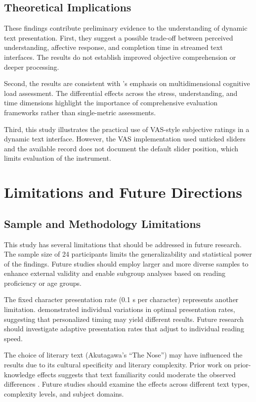 \documentclass[authoryear]{elsarticle}
\begin{document}
\subsection{Theoretical Implications}
These findings contribute preliminary evidence to the understanding of dynamic text presentation. First, they suggest a possible trade-off between perceived understanding, affective response, and completion time in streamed text interfaces. The results do not establish improved objective comprehension or deeper processing.

Second, the results are consistent with \citet{darejeh2024}'s emphasis on multidimensional cognitive load assessment. The differential effects across the stress, understanding, and time dimensions highlight the importance of comprehensive evaluation frameworks rather than single-metric assessments.

Third, this study illustrates the practical use of VAS-style subjective ratings in a dynamic text interface. However, the VAS implementation used unticked sliders and the available record does not document the default slider position, which limits evaluation of the instrument.

\section{Limitations and Future Directions}
\subsection{Sample and Methodology Limitations}
This study has several limitations that should be addressed in future research. The sample size of 24 participants limits the generalizability and statistical power of the findings. Future studies should employ larger and more diverse samples to enhance external validity and enable subgroup analyses based on reading proficiency or age groups.

The fixed character presentation rate (0.1 s per character) represents another limitation. \citet{uetsuki2017} demonstrated individual variations in optimal presentation rates, suggesting that personalized timing may yield different results. Future research should investigate adaptive presentation rates that adjust to individual reading speed.

The choice of literary text (Akutagawa's ``The Nose'') may have influenced the results due to its cultural specificity and literary complexity. Prior work on prior-knowledge effects suggests that text familiarity could moderate the observed differences \citep{amadieu2009}. Future studies should examine the effects across different text types, complexity levels, and subject domains.
\end{document}
